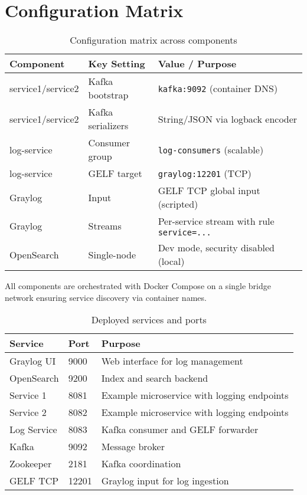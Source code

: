\documentclass[12pt,a4paper]{report}
\begin{document}
\section{Configuration Matrix}
\begin{table}[H]
\centering
\begin{tabular}{p{4cm} p{4cm} p{7cm}}
\toprule
\textbf{Component} & \textbf{Key Setting} & \textbf{Value / Purpose} \\
\midrule
service1/service2 & Kafka bootstrap & \texttt{kafka:9092} (container DNS) \\
service1/service2 & Kafka serializers & String/JSON via logback encoder \\
log-service & Consumer group & \texttt{log-consumers} (scalable) \\
log-service & GELF target & \texttt{graylog:12201} (TCP) \\
Graylog & Input & GELF TCP global input (scripted) \\
Graylog & Streams & Per-service stream with rule \texttt{service=...} \\
OpenSearch & Single-node & Dev mode, security disabled (local) \\
\bottomrule
\end{tabular}
\caption{Configuration matrix across components}
\end{table}
All components are orchestrated with Docker Compose on a single bridge network ensuring service discovery via container names.

\begin{table}[H]
\centering
\begin{tabular}{llp{7cm}}
\toprule
\textbf{Service} & \textbf{Port} & \textbf{Purpose} \\
\midrule
Graylog UI & 9000 & Web interface for log management \\
OpenSearch & 9200 & Index and search backend \\
Service 1 & 8081 & Example microservice with logging endpoints \\
Service 2 & 8082 & Example microservice with logging endpoints \\
Log Service & 8083 & Kafka consumer and GELF forwarder \\
Kafka & 9092 & Message broker \\
Zookeeper & 2181 & Kafka coordination \\
GELF TCP & 12201 & Graylog input for log ingestion \\
\bottomrule
\end{tabular}
\caption{Deployed services and ports}
\end{table}
\end{document}
